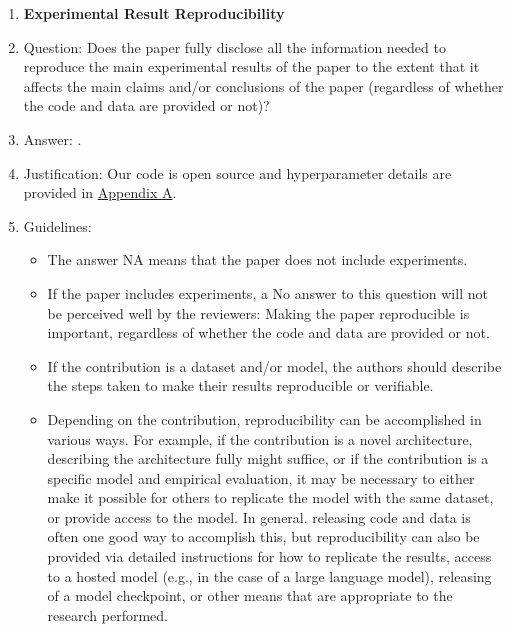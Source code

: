 \documentclass{article}
\begin{document}
\begin{enumerate}
\begin{itemize}
        \item The proofs can either appear in the main paper or the supplemental material, but if they appear in the supplemental material, the authors are encouraged to provide a short proof sketch to provide intuition.
        \item Inversely, any informal proof provided in the core of the paper should be complemented by formal proofs provided in appendix or supplemental material.
        \item Theorems and Lemmas that the proof relies upon should be properly referenced.
    \end{itemize}
    \item {\bf Experimental Result Reproducibility}
    \item[] Question: Does the paper fully disclose all the information needed to reproduce the main experimental results of the paper to the extent that it affects the main claims and/or conclusions of the paper (regardless of whether the code and data are provided or not)?
    \item[] Answer: \answerYes{}.
    \item[] Justification: Our code is open source and hyperparameter details are provided in \hyperref[app:implementation]{Appendix A}.
    \item[] Guidelines:
    \begin{itemize}
        \item The answer NA means that the paper does not include experiments.
        \item If the paper includes experiments, a No answer to this question will not be perceived well by the reviewers: Making the paper reproducible is important, regardless of whether the code and data are provided or not.
        \item If the contribution is a dataset and/or model, the authors should describe the steps taken to make their results reproducible or verifiable.
        \item Depending on the contribution, reproducibility can be accomplished in various ways. For example, if the contribution is a novel architecture, describing the architecture fully might suffice, or if the contribution is a specific model and empirical evaluation, it may be necessary to either make it possible for others to replicate the model with the same dataset, or provide access to the model. In general. releasing code and data is often one good way to accomplish this, but reproducibility can also be provided via detailed instructions for how to replicate the results, access to a hosted model (e.g., in the case of a large language model), releasing of a model checkpoint, or other means that are appropriate to the research performed.

\end{itemize}
\end{enumerate}
\end{document}
